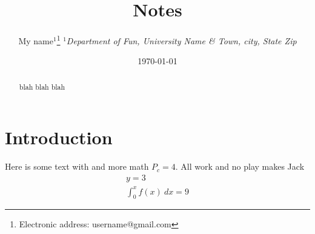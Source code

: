 \documentclass[pdftex]{article}
\begin{document}
\title{Notes}

\author{My name$^{1}$\footnote{Electronic address: username@gmail.com}
{\it $^{1}$Department of Fun, University Name \& Town, city, State Zip}}

\date{\today}

\begin{abstract}
blah blah blah
\end{abstract}

\maketitle %

\tableofcontents

\newpage

\section{Introduction}

Here is some text with\cite{name1,*name2} and more math $P_c=4$. All work and no play makes Jack
\begin{equation}
\begin{gathered}
y=3 \\
\int_0^x f(x)\ dx=9
\end{gathered}
\label{eq:name_of_eq}
\end{equation}

\end{document}
